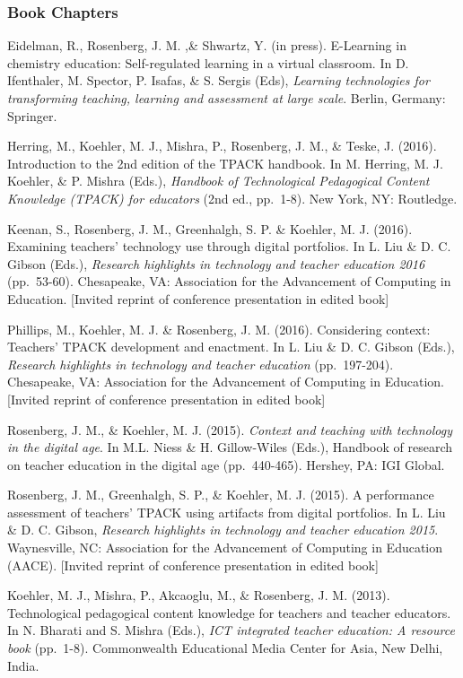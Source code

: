 \documentclass[]{article}
\begin{document}
\subsubsection{Book Chapters}\label{book-chapters}

Eidelman, R., Rosenberg, J. M. ,\& Shwartz, Y. (in press). E-Learning in
chemistry education: Self-regulated learning in a virtual classroom. In
D. Ifenthaler, M. Spector, P. Isafas, \& S. Sergis (Eds), \emph{Learning
technologies for transforming teaching, learning and assessment at large
scale}. Berlin, Germany: Springer.

Herring, M., Koehler, M. J., Mishra, P., Rosenberg, J. M., \& Teske, J.
(2016). Introduction to the 2nd edition of the TPACK handbook. In M.
Herring, M. J. Koehler, \& P. Mishra (Eds.), \emph{Handbook of
Technological Pedagogical Content Knowledge (TPACK) for educators} (2nd
ed., pp.~1-8). New York, NY: Routledge.

Keenan, S., Rosenberg, J. M., Greenhalgh, S. P. \& Koehler, M. J.
(2016). Examining teachers' technology use through digital portfolios.
In L. Liu \& D. C. Gibson (Eds.), \emph{Research highlights in
technology and teacher education 2016} (pp.~53-60). Chesapeake, VA:
Association for the Advancement of Computing in Education. {[}Invited
reprint of conference presentation in edited book{]}

Phillips, M., Koehler, M. J. \& Rosenberg, J. M. (2016). Considering
context: Teachers' TPACK development and enactment. In L. Liu \& D. C.
Gibson (Eds.), \emph{Research highlights in technology and teacher
education} (pp.~197-204). Chesapeake, VA: Association for the
Advancement of Computing in Education. {[}Invited reprint of conference
presentation in edited book{]}

Rosenberg, J. M., \& Koehler, M. J. (2015). \emph{Context and teaching
with technology in the digital age}. In M.L. Niess \& H. Gillow-Wiles
(Eds.), Handbook of research on teacher education in the digital age
(pp.~440-465). Hershey, PA: IGI Global.

Rosenberg, J. M., Greenhalgh, S. P., \& Koehler, M. J. (2015). A
performance assessment of teachers' TPACK using artifacts from digital
portfolios. In L. Liu \& D. C. Gibson, \emph{Research highlights in
technology and teacher education 2015}. Waynesville, NC: Association for
the Advancement of Computing in Education (AACE). {[}Invited reprint of
conference presentation in edited book{]}

Koehler, M. J., Mishra, P., Akcaoglu, M., \& Rosenberg, J. M. (2013).
Technological pedagogical content knowledge for teachers and teacher
educators. In N. Bharati and S. Mishra (Eds.), \emph{ICT integrated
teacher education: A resource book} (pp.~1-8). Commonwealth Educational
Media Center for Asia, New Delhi, India.
\end{document}
